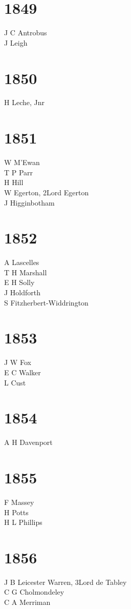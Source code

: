 \begin{multicols}{2}
  \section*{1849}
  J C Antrobus \\
  J Leigh \\
  \section*{1850}
  H Leche, Jnr \\
  \section*{1851}
  W M'Ewan \\
  T P Parr \\
  H Hill \\
  W Egerton, 2\nd Lord Egerton \\
  J Higginbotham \\
  \section*{1852}
  A Lascelles \\
  T H Marshall \\
  E H Solly \\
  J Holdforth \\
  S Fitzherbert-Widdrington \\
  \section*{1853}
  J W Fox \\
  E C Walker \\
  L Cust \\
  \section*{1854}
  A H Davenport \\
  \section*{1855}
  F Massey \\
  H Potts \\
  H L Phillips \\
  \section*{1856}
  J B Leicester Warren, 3\rd Lord de Tabley \\
  C G Cholmondeley \\
  C A Merriman \\

\end{multicols}
